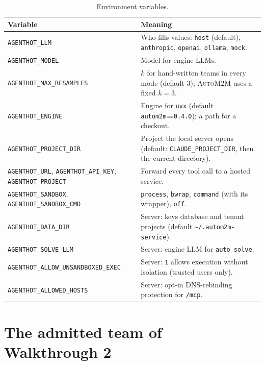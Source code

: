 \documentclass[10pt,a4paper]{article}
\newcommand{\auto}{\textsc{AutoM2M}}
\newcommand{\code}[1]{\texttt{#1}}
\newcommand{\file}[1]{\texttt{#1}}
\newcommand{\mcptool}[1]{\texttt{#1}}
\begin{document}
\begin{table}[!htb]
\centering\small
\caption{Environment variables.}
\label{tab:env}
\begin{tabularx}{\textwidth}{@{}L{5.3cm} Y@{}}
\toprule
{}Variable & Meaning \\
\midrule
\code{AGENTHOT\_LLM} & Who fills values: \code{host} (default), \code{anthropic}, \code{openai}, \code{ollama}, \code{mock}. \\
\code{AGENTHOT\_MODEL} & Model for engine LLMs. \\
\code{AGENTHOT\_MAX\_RESAMPLES} & $k$ for hand-written teams in every mode (default 3); \auto{} uses a fixed $k=3$. \\
\code{AGENTHOT\_ENGINE} & Engine for \code{uvx} (default \code{autom2m==0.4.0}); a path for a checkout. \\
\code{AGENTHOT\_PROJECT\_DIR} & Project the local server opens (default: \code{CLAUDE\_PROJECT\_DIR}, then the current directory). \\
\code{AGENTHOT\_URL}, \code{AGENTHOT\_API\_KEY}, \code{AGENTHOT\_PROJECT} & Forward every tool call to a hosted service. \\
\code{AGENTHOT\_SANDBOX}, \code{AGENTHOT\_SANDBOX\_CMD} & \code{process}, \code{bwrap}, \code{command} (with its wrapper), \code{off}. \\
\code{AGENTHOT\_DATA\_DIR} & Server: keys database and tenant projects (default \file{\textasciitilde/.autom2m-service}). \\
\code{AGENTHOT\_SOLVE\_LLM} & Server: engine LLM for \mcptool{auto\_solve}. \\
\code{AGENTHOT\_ALLOW\_UNSANDBOXED\_EXEC} & Server: \code{1} allows execution without isolation (trusted users only). \\
\code{AGENTHOT\_ALLOWED\_HOSTS} & Server: opt-in DNS-rebinding protection for \code{/mcp}. \\
\bottomrule
\end{tabularx}
\end{table}

\section{The admitted team of Walkthrough 2}\label{app:team}
\end{document}
